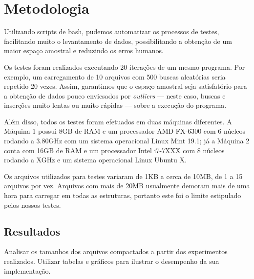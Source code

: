 \chapter{Metodologia}\label{cap-metodologia}


Utilizando scripts de bash, pudemos automatizar os processos de testes, facilitando muito o levantamento de dados, possibilitando a obtenção de um maior espaço amostral e reduzindo os erros humanos. 

Os testes foram realizados executando 20 iterações de um mesmo programa. Por exemplo, um carregamento de 10 arquivos com 500 buscas aleatórias seria repetido 20 vezes. Assim, garantimos que o espaço amostral seja satisfatório para a obtenção de dados pouco enviesados por \textit{outliers} --- neste caso, buscas e inserções muito lentas ou muito rápidas --- sobre a execução do programa.

Além disso, todos os testes foram efetuados em duas máquinas diferentes. A Máquina 1 possui 8GB de RAM e um processador AMD FX-6300 com 6 núcleos rodando a 3.80GHz com um sistema operacional Linux Mint 19.1; já a Máquina 2 conta com 16GB de RAM e um processador Intel i7-7XXX com 8 núcleos rodando a XGHz e um sistema operacional Linux Ubuntu X.

Os arquivos utilizados para testes variaram de 1KB a cerca de 10MB, de 1 a 15 arquivos por vez. Arquivos com mais de 20MB usualmente demoram mais de uma hora para carregar em todas as estruturas, portanto este foi o limite estipulado pelos nossos testes.

\section{Resultados}

Analisar os tamanhos dos arquivos compactados a partir dos experimentos realizados. Utilizar tabelas e gráficos para ilustrar o desempenho da sua implementação.








